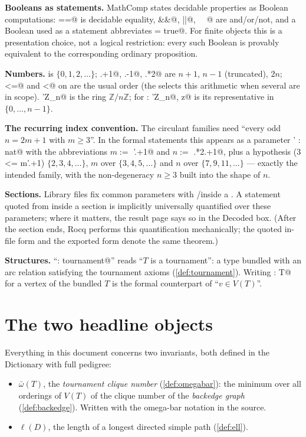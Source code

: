 \textbf{Booleans as statements.} MathComp states decidable properties
as Boolean computations: \rocqinline@==@ is decidable equality,
\rocqinline@&&@, \rocqinline@||@, \rocqinline@~~@ are and/or/not, and a
Boolean \rocqinline@b@ used as a statement abbreviates
\rocqinline@b = true@. For finite objects this is a presentation
choice, not a logical restriction: every such Boolean is provably
equivalent to the corresponding ordinary proposition.

\textbf{Numbers.} \rocqinline@nat@ is $\{0,1,2,\dots\}$;
\rocqinline@n.+1@, \rocqinline@n.-1@, \rocqinline@n.*2@ are $n{+}1$,
$n{-}1$ (truncated), $2n$; \rocqinline@<=@ and \rocqinline@<@ on
\rocqinline@nat@ are the usual order (the \rocqinline@%
selects this arithmetic when several are in scope).
\rocqinline@'Z_n@ is the ring $\mathbb{Z}/n\mathbb{Z}$; for
\rocqinline@z : 'Z_n@, \rocqinline@val z@ is its representative in
$\{0,\dots,n-1\}$.

\textbf{The recurring index convention.} The circulant families need
``every odd $n = 2m+1$ with $m \ge 3$''. In the formal statements this
appears as a parameter \rocqinline@m' : nat@ with the abbreviations
$m :=$ \rocqinline@m'.+1@ and $n :=$ \rocqinline@m.*2.+1@, plus a
hypothesis \rocqinline@(3 <= m'.+1)%
$\{2,3,4,\dots\}$, $m$ over $\{3,4,5,\dots\}$ and $n$ over
$\{7,9,11,\dots\}$ --- exactly the intended family, with the
non-degeneracy $n \ge 3$ built into the shape of $n$.

\textbf{Sections.} Library files fix common parameters with
\rocqinline@Variable@/\rocqinline@Hypothesis@ inside a
\rocqinline@Section@. A statement quoted from inside a section is
implicitly universally quantified over these parameters; where it
matters, the result page says so in the Decoded box. (After the
section ends, Rocq performs this quantification mechanically; the
quoted in-file form and the exported form denote the same theorem.)

\textbf{Structures.} ``\rocqinline@T : tournament@'' reads ``$T$ is a
tournament'': a type bundled with an arc relation satisfying the
tournament axioms (\cref{def:tournament}). Writing
\rocqinline@v : T@ for a vertex of the bundled $T$ is the formal
counterpart of ``$v \in V(T)$''.

\section{The two headline objects}

Everything in this document concerns two invariants, both defined in
the Dictionary with full pedigree:

\begin{itemize}
\item $\bar\omega(T)$, the \emph{tournament clique number}
  (\cref{def:omegabar}): the minimum over all orderings of $V(T)$ of
  the clique number of the \emph{backedge graph}
  (\cref{def:backedge}). Written with the omega-bar notation in the source.
\item $\ell(D)$, the length of a longest directed simple path
  (\cref{def:ell}).
\end{itemize}
